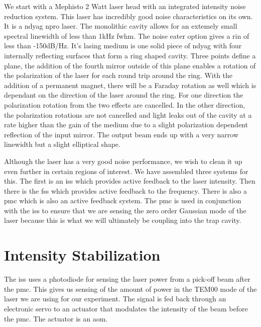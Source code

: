 We start with a Mephisto 2 Watt laser head with an integrated intensity
noise reduction system.
This laser has incredibly good noise characteristics on its own.
It is a \ac{ndyag} \ac{npro} laser. The monolithic cavity allows for an
extemely small spectral linewidth of less than 1kHz \ac{fwhm}. The noise
eater option gives a \ac{rin} of less than -150dB/Hz.
It's lasing medium is one solid piece of \ac{ndyag} with four internally reflecting
surfaces that form a ring shaped cavity. Three points define a plane, the
addition of the fourth mirror outside of this plane enables a rotation of
the polarization of the laser for each round trip around the ring. With the addition
of a permanent magnet, there will be a Faraday rotation as well which is
dependant on the direction of the laser around the ring. For one direction
the polarization rotation from the two effects are cancelled. In the other
direction, the polarization rotations are not cancelled and light leaks out
of the cavity at a rate higher than the gain of the medium due to a slight
polarization dependent reflection of the input mirror. The output beam ends
up with a very narrow linewidth but a slight elliptical shape.

Although the laser has a very good noise performance, we wish to clean it up
even further in certain regions of interest. We have assembled three systems
for this. The first is an \ac{iss} which provides active feedback to the laser
intensity. Then there is the \ac{fss} which provides active feedback to the
frequency. There is also a \ac{pmc} which is also an active feedback system. The
\ac{pmc} is used in conjunction with the \ac{iss} to ensure that we are
sensing the zero order Gaussian mode of the laser because this is what
we will ultimately be coupling into the trap cavity.

\section{Intensity Stabilization}


The \ac{iss} uses a photodiode for sensing the laser power from a pick-off
beam after the \ac{pmc}. This gives us sensing of the amount of power in
the TEM00 mode of the laser we are using for our experiment. The signal is
fed back through an electronic servo to an actuator that modulates the
intensity of the beam before the \ac{pmc}. The actuator is an \ac{aom}.

